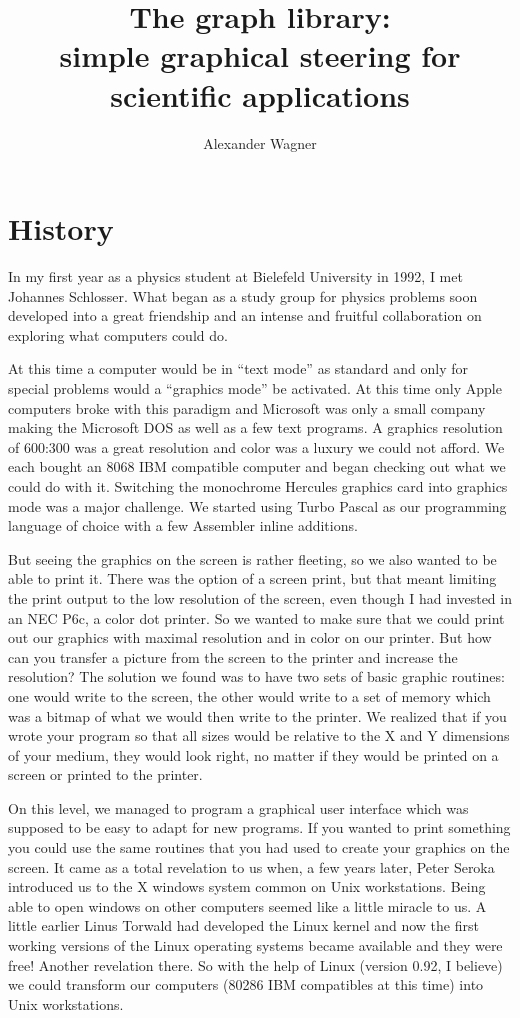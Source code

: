 \documentclass[12pt,letterpaper]{article}
\begin{document}
\author{Alexander Wagner}
\title{The graph library:\\simple graphical steering for scientific
  applications }
\maketitle
\newpage
\tableofcontents
\newpage
\section{History}
In my first year as a physics student at Bielefeld
University in 1992, I met Johannes Schlosser. What began as a study group
for physics problems soon developed into a great friendship and an
intense and fruitful collaboration on exploring what computers could
do.

At this time a computer would be in ``text mode'' as standard and only
for special problems would a ``graphics mode'' be activated. At this
time only Apple computers broke with this paradigm and Microsoft was
only a small company making the Microsoft DOS as well as a few text
programs. A graphics resolution of 600:300 was a great resolution and
color was a luxury we could not afford. We each bought an 8068 IBM
compatible computer and began checking out what we could do with
it. Switching the monochrome Hercules graphics card into graphics mode
was a major challenge. We started using Turbo Pascal as our
programming language of choice with a few Assembler inline additions.

But seeing the graphics on the screen is rather fleeting, so we
also wanted to be able to print it. There was the option of a screen
print, but that meant limiting the print output to the low resolution
of the screen, even though I had invested in an NEC P6c, a color dot
printer. So we wanted to make sure that we could print out our
graphics with maximal resolution and in color on our printer. But how
can you transfer a picture from the screen to the printer and increase
the resolution? The solution we found was to have two sets of basic
graphic routines: one would write to the screen, the other would write
to a set of memory which was a bitmap of what we would then write to
the printer. We realized that if you wrote your program so that all
sizes would be relative to the X and Y dimensions of your medium, they
would look right, no matter if they would be printed on a screen or
printed to the printer.

On this level, we managed to program a graphical user interface which
was supposed to be easy to adapt for new programs. If you wanted to
print something you could use the same routines that you had used to create
your graphics on the screen. It came as a total revelation to us when,
a few years later, Peter Seroka introduced us to the X windows system
common on Unix workstations. Being able to open windows on other
computers seemed like a little miracle to us. A little earlier Linus
Torwald had developed the Linux kernel and now the first working
versions of the Linux operating systems became available and they were
free! Another revelation there. So with the help of Linux (version
0.92, I believe) we could transform our computers (80286 IBM
compatibles at this time) into Unix workstations. 
\end{document}
